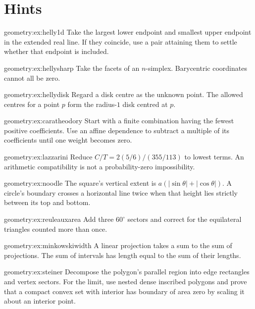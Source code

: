 \section{Hints}

\begin{hint}{geometry:ex:helly1d}
Take the largest lower endpoint and smallest upper endpoint in the extended real line. If they coincide, use a pair attaining them to settle whether that endpoint is included.
\end{hint}
\begin{hint}{geometry:ex:hellysharp}
Take the facets of an $n$-simplex. Barycentric coordinates cannot all be zero.
\end{hint}
\begin{hint}{geometry:ex:hellydisk}
Regard a disk centre as the unknown point. The allowed centres for a point $p$ form the radius-$1$ disk centred at $p$.
\end{hint}
\begin{hint}{geometry:ex:caratheodory}
Start with a finite combination having the fewest positive coefficients. Use an affine dependence to subtract a multiple of its coefficients until one weight becomes zero.
\end{hint}
\begin{hint}{geometry:ex:lazzarini}
Reduce $C/T=2(5/6)/(355/113)$ to lowest terms. An arithmetic compatibility is not a probability-zero impossibility.
\end{hint}
\begin{hint}{geometry:ex:noodle}
The square's vertical extent is $a(|\sin\theta|+|\cos\theta|)$. A circle's boundary crosses a horizontal line twice when that height lies strictly between its top and bottom.
\end{hint}
\begin{hint}{geometry:ex:reuleauxarea}
Add three $60^\circ$ sectors and correct for the equilateral triangles counted more than once.
\end{hint}
\begin{hint}{geometry:ex:minkowskiwidth}
A linear projection takes a sum to the sum of projections. The sum of intervals has length equal to the sum of their lengths.
\end{hint}
\begin{hint}{geometry:ex:steiner}
Decompose the polygon's parallel region into edge rectangles and vertex sectors. For the limit, use nested dense inscribed polygons and prove that a compact convex set with interior has boundary of area zero by scaling it about an interior point.
\end{hint}
